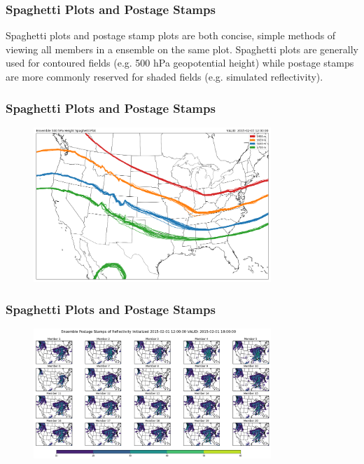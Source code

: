 \documentclass{beamer}
\begin{document}
\begin{frame}
\frametitle{Spaghetti Plots and Postage Stamps}
Spaghetti plots and postage stamp plots are both concise, simple methods of viewing all members in a ensemble on the same plot. Spaghetti plots are generally used for contoured fields (e.g. 500 hPa geopotential height) while postage stamps are more commonly reserved for shaded fields (e.g. simulated reflectivity).


\end{frame}

\begin{frame}
  \frametitle{Spaghetti Plots and Postage Stamps}
  \begin{figure}
    \includegraphics[width=0.8\textwidth]{spaghetti}
  \end{figure}
\end{frame}

\begin{frame}
  \frametitle{Spaghetti Plots and Postage Stamps}
  \begin{figure}
    \includegraphics[width=0.8\textwidth]{postage_stamp}
  \end{figure}
\end{frame}
\end{document}

